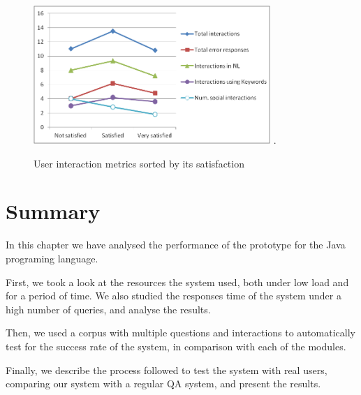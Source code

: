 \begin{figure}[!tbh]
  \centering
  \includegraphics[width=0.8\textwidth]{img/test/exp_satisfaction.png}
  \DeclareGraphicsExtensions.  
  \caption{User interaction metrics sorted by its satisfaction}
  \label{fig:exp_satisfaction}
\end{figure}

\section{Summary}

In this chapter we have analysed the performance of the prototype for the Java programing language.

First, we took a look at the resources the system used, both under low load and for a period of time. We also studied the responses time of the system under a high number of queries, and analyse the results.

Then, we used a corpus with multiple questions and interactions to automatically test for the success rate of the system, in comparison with each of the modules.

Finally, we describe the process followed to test the system with real users, comparing our system with a regular \ac{QA} system, and present the results.